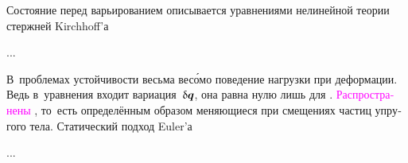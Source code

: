

\begin{otherlanguage}{russian}

Состояние перед варьированием описывается уравнениями нелинейной теории стержней Kirchhoff’а

...



\end{otherlanguage}




\begin{otherlanguage}{russian}

В~проблемах устойчивости весьма вес\'{о}мо поведение нагрузки при деформации.
Ведь в~уравнения входит вариация~${\updelta\hspace{-0.1ex}\bm{q}}$, она равна нулю лишь для  .
\textcolor{magenta}{Распространены}  , то~есть определённым образом меняющиеся при смещениях частиц упругого тела.
Статический подход Euler’а

...



\end{otherlanguage}




